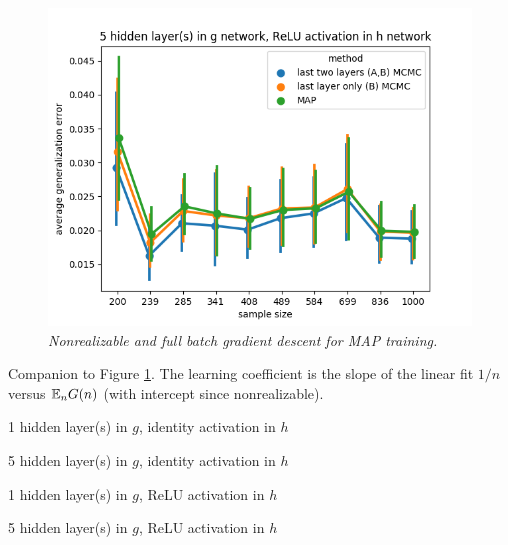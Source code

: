 \documentclass{article} %
\begin{document}
\begin{figure}[t!]
\begin{center}
		\includegraphics[scale=0.35]{taskid3.png}
	\end{center}
	\caption{\textit{Nonrealizable and full batch gradient descent for MAP training.}}
	\label{fig:avg_gen_err_fullbatch_nonrealizable}
\end{figure}


\begin{table}[h!]%
	\centering
	\caption{Companion to Figure \ref{fig:avg_gen_err_fullbatch_nonrealizable}. The learning coefficient is the slope of the linear fit $1/n$ versus $\mathbb{E}_n G(n)$ (with intercept since nonrealizable).}%
	\label{table::avg_gen_err_fullbatch_nonrealizable}%
	\begin{tiny}
	\begin{subtable}[t]{2.5in}
		\caption{1 hidden layer(s) in $g$, identity activation in $h$}
		
	\end{subtable}
	\quad
	\begin{subtable}[t]{2.5in}
		\caption{5 hidden layer(s) in $g$, identity activation in $h$}		
	\end{subtable}
	\quad 
	\begin{subtable}[t]{2.5in}
		\caption{1 hidden layer(s) in $g$, ReLU activation in $h$}
		
	\end{subtable}
	\quad 
	\begin{subtable}[t]{2.5in}
		\caption{5 hidden layer(s) in $g$, ReLU activation in $h$}		
	\end{subtable}
	\end{tiny}
\end{table}
\end{document}
